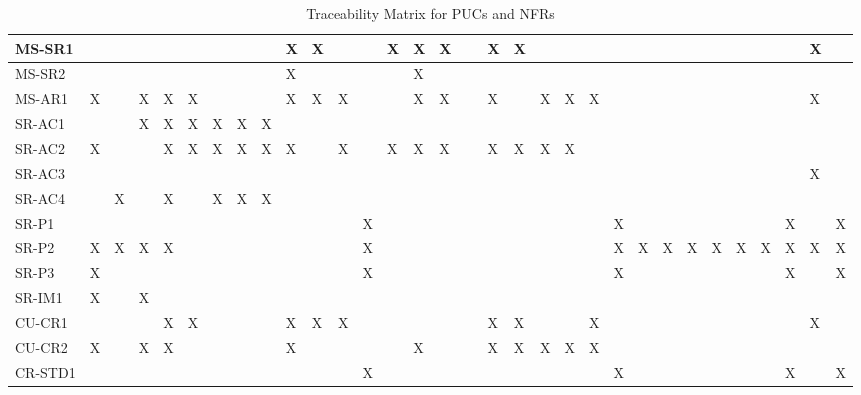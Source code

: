 \documentclass[12pt]{article}
\begin{document}
\begin{table}[!ht]
{\begin{tabular}{|l|l|l|l|l|l|l|l|l|l|l|l|l|l|l|l|l|l|l|l|l|l|l|l|l|l|l|l|l|l|l|l|}
      MS-SR1 & ~ & ~ & ~ & ~ & ~ & ~ & ~ & ~ & X & X & ~ & ~ & X & X & X & ~ & X & X & ~ & ~ & ~ & ~ & ~ & ~ & ~ & ~ & ~ & ~ & ~ & X & ~ \\ \hline
      MS-SR2 & ~ & ~ & ~ & ~ & ~ & ~ & ~ & ~ & X & ~ & ~ & ~ & ~ & X & ~ & ~ & ~ & ~ & ~ & ~ & ~ & ~ & ~ & ~ & ~ & ~ & ~ & ~ & ~ & ~ & ~ \\ \hline
      MS-AR1 & X & ~ & X & X & X & ~ & ~ & ~ & X & X & X & ~ & ~ & X & X & ~ & X & ~ & X & X & X & ~ & ~ & ~ & ~ & ~ & ~ & ~ & ~ & X & ~ \\ \hline
      SR-AC1 & ~ & ~ & X & X & X & X & X & X & ~ & ~ & ~ & ~ & ~ & ~ & ~ & ~ & ~ & ~ & ~ & ~ & ~ & ~ & ~ & ~ & ~ & ~ & ~ & ~ & ~ & ~ & ~ \\ \hline
      SR-AC2 & X & ~ & ~ & X & X & X & X & X & X & ~ & X & ~ & X & X & X & ~ & X & X & X & X & ~ & ~ & ~ & ~ & ~ & ~ & ~ & ~ & ~ & ~ & ~ \\ \hline
      SR-AC3 & ~ & ~ & ~ & ~ & ~ & ~ & ~ & ~ & ~ & ~ & ~ & ~ & ~ & ~ & ~ & ~ & ~ & ~ & ~ & ~ & ~ & ~ & ~ & ~ & ~ & ~ & ~ & ~ & ~ & X & ~ \\ \hline
      SR-AC4 & ~ & X & ~ & X & ~ & X & X & X & ~ & ~ & ~ & ~ & ~ & ~ & ~ & ~ & ~ & ~ & ~ & ~ & ~ & ~ & ~ & ~ & ~ & ~ & ~ & ~ & ~ & ~ & ~ \\ \hline
      SR-P1 & ~ & ~ & ~ & ~ & ~ & ~ & ~ & ~ & ~ & ~ & ~ & X & ~ & ~ & ~ & ~ & ~ & ~ & ~ & ~ & ~ & X & ~ & ~ & ~ & ~ & ~ & ~ & X & ~ & X \\ \hline
      SR-P2 & X & X & X & X & ~ & ~ & ~ & ~ & ~ & ~ & ~ & X & ~ & ~ & ~ & ~ & ~ & ~ & ~ & ~ & ~ & X & X & X & X & X & X & X & X & X & X \\ \hline
      SR-P3 & X & ~ & ~ & ~ & ~ & ~ & ~ & ~ & ~ & ~ & ~ & X & ~ & ~ & ~ & ~ & ~ & ~ & ~ & ~ & ~ & X & ~ & ~ & ~ & ~ & ~ & ~ & X & ~ & X \\ \hline
      SR-IM1 & X & ~ & X & ~ & ~ & ~ & ~ & ~ & ~ & ~ & ~ & ~ & ~ & ~ & ~ & ~ & ~ & ~ & ~ & ~ & ~ & ~ & ~ & ~ & ~ & ~ & ~ & ~ & ~ & ~ & ~ \\ \hline
      CU-CR1 & ~ & ~ & ~ & X & X & ~ & ~ & ~ & X & X & X & ~ & ~ & ~ & ~ & ~ & X & X & ~ & ~ & X & ~ & ~ & ~ & ~ & ~ & ~ & ~ & ~ & X & ~ \\ \hline
      CU-CR2 & X & ~ & X & X & ~ & ~ & ~ & ~ & X & ~ & ~ & ~ & ~ & X & ~ & ~ & X & X & X & X & X & ~ & ~ & ~ & ~ & ~ & ~ & ~ & ~ & ~ & ~ \\ \hline
      CR-STD1 & ~ & ~ & ~ & ~ & ~ & ~ & ~ & ~ & ~ & ~ & ~ & X & ~ & ~ & ~ & ~ & ~ & ~ & ~ & ~ & ~ & X & ~ & ~ & ~ & ~ & ~ & ~ & X & ~ & X \\ \hline
  \end{tabular}}
  \caption{Traceability Matrix for PUCs and NFRs}
\end{table}
\end{document}
